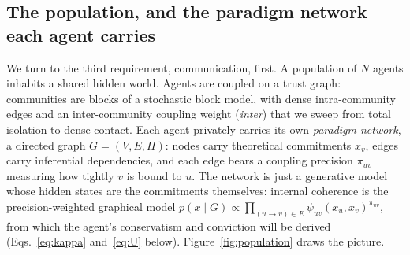 \documentclass[runningheads]{llncs}
\begin{document}
\subsection{The population, and the paradigm network each agent carries}
\label{sec:carryover}

We turn to the third requirement, communication, first. A population of $N$ agents inhabits a
shared hidden world. Agents are
coupled on a trust graph: communities are blocks of a stochastic block model, with dense
intra-community edges and an inter-community coupling weight (\emph{inter}) that we sweep from
total isolation to dense contact. Each agent privately carries its own \emph{paradigm network}, a directed graph
$G=(V,E,\Pi)$: nodes carry theoretical commitments $x_v$, edges carry inferential dependencies,
and each edge bears a coupling precision $\pi_{uv}$ measuring how tightly $v$ is bound to $u$.
The network is just a generative model whose hidden states are the commitments themselves:
internal coherence is the precision-weighted graphical model
$p(x\mid G)\propto\prod_{(u\to v)\in E}\psi_{uv}(x_u,x_v)^{\pi_{uv}}$, from which the agent's
conservatism and conviction will be derived (Eqs.~\ref{eq:kappa}
and~\ref{eq:U} below). Figure~\ref{fig:population} draws the picture.
\end{document}
